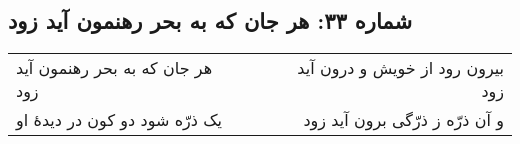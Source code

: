 \begin{center}
\section*{شماره ۳۳: هر جان که به بحر رهنمون آید زود}
\label{sec:033}
\begin{longtable}{l p{0.5cm} r}
هر جان که به بحر رهنمون آید زود
&&
بیرون رود از خویش و درون آید زود
\\
یک ذرّه شود دو کون در دید‌هٔ او
&&
و آن ذرّه ز ذرّگی برون آید زود
\\
\end{longtable}
\end{center}
